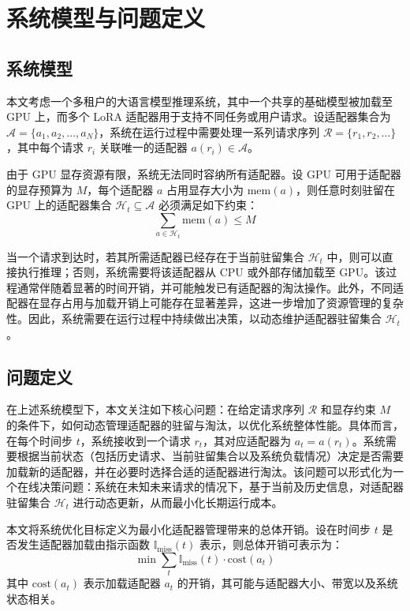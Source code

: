 \section{系统模型与问题定义}
\subsection{系统模型}
本文考虑一个多租户的大语言模型推理系统，其中一个共享的基础模型被加载至 GPU 上，而多个 LoRA 适配器用于支持不同任务或用户请求。设适配器集合为 $\mathcal{A}=\{a_1,a_2,\dots,a_N\}$，系统在运行过程中需要处理一系列请求序列 $\mathcal{R}=\{r_1,r_2,\dots\}$，其中每个请求 $r_i$ 关联唯一的适配器 $a(r_i)\in\mathcal{A}$。

由于 GPU 显存资源有限，系统无法同时容纳所有适配器。设 GPU 可用于适配器的显存预算为 $M$，每个适配器 $a$ 占用显存大小为 $\mathrm{mem}(a)$，则任意时刻驻留在 GPU 上的适配器集合 $\mathcal{H}_t\subseteq\mathcal{A}$ 必须满足如下约束：
\begin{equation}
\sum_{a\in\mathcal{H}_t}\mathrm{mem}(a)\le M
\end{equation}

当一个请求到达时，若其所需适配器已经存在于当前驻留集合 $\mathcal{H}_t$ 中，则可以直接执行推理；否则，系统需要将该适配器从 CPU 或外部存储加载至 GPU。该过程通常伴随着显著的时间开销，并可能触发已有适配器的淘汰操作。此外，不同适配器在显存占用与加载开销上可能存在显著差异，这进一步增加了资源管理的复杂性。因此，系统需要在运行过程中持续做出决策，以动态维护适配器驻留集合 $\mathcal{H}_t$。

\subsection{问题定义}
在上述系统模型下，本文关注如下核心问题：在给定请求序列 $\mathcal{R}$ 和显存约束 $M$ 的条件下，如何动态管理适配器的驻留与淘汰，以优化系统整体性能。具体而言，在每个时间步 $t$，系统接收到一个请求 $r_t$，其对应适配器为 $a_t=a(r_t)$。系统需要根据当前状态（包括历史请求、当前驻留集合以及系统负载情况）决定是否需要加载新的适配器，并在必要时选择合适的适配器进行淘汰。该问题可以形式化为一个在线决策问题：系统在未知未来请求的情况下，基于当前及历史信息，对适配器驻留集合 $\mathcal{H}_t$ 进行动态更新，从而最小化长期运行成本。

本文将系统优化目标定义为最小化适配器管理带来的总体开销。设在时间步 $t$ 是否发生适配器加载由指示函数 $\mathbb{I}_{\text{miss}}(t)$ 表示，则总体开销可表示为：
\begin{equation}
\min\sum_t\mathbb{I}_{\text{miss}}(t)\cdot\mathrm{cost}(a_t)
\end{equation}
其中 $\mathrm{cost}(a_t)$ 表示加载适配器 $a_t$ 的开销，其可能与适配器大小、带宽以及系统状态相关。

